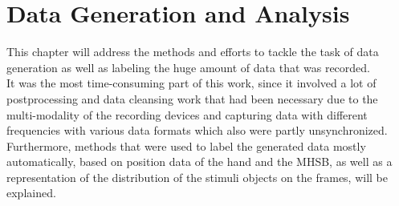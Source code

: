 
\chapter{Data Generation and Analysis} %

\label{Data} %

This chapter will address the methods and efforts to tackle the task of data generation as well as labeling the huge amount of data that was recorded.\\
It was the most time-consuming part of this work, since it involved a lot of postprocessing and data cleansing work that had been necessary due to the multi-modality of the recording devices and capturing data with different frequencies with various data formats which also were partly unsynchronized. Furthermore, methods that were used to label the generated data mostly automatically, based on position data of the hand and the MHSB, as well as a representation of the distribution of the stimuli objects on the frames, will be explained.


